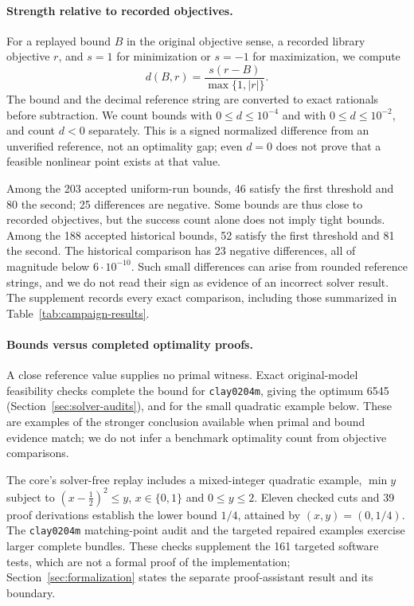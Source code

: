 

\paragraph{Strength relative to recorded objectives.}
\label{sec:reference-comparison}
For a replayed bound $B$ in the original objective sense, a recorded library
objective $r$, and $s=1$ for minimization or $s=-1$ for maximization, we compute
\[
        d(B,r)=\frac{s(r-B)}{\max\{1,|r|\}}.
\]
The bound and the decimal reference string are converted to exact rationals
before subtraction. We count bounds with $0\le d\le 10^{-4}$ and with
$0\le d\le 10^{-2}$, and count $d<0$ separately. This is a signed normalized
difference from an unverified reference, not an optimality gap; even $d=0$
does not prove that a feasible nonlinear point exists at that value.

Among the 203 accepted uniform-run bounds, 46 satisfy the first threshold
and 80 the second; 25 differences are negative. Some bounds are thus close to
recorded objectives, but the success count alone does not imply tight bounds.
Among the 188 accepted historical bounds, 52 satisfy the first threshold and 81
the second. The historical comparison has 23 negative differences, all of
magnitude below $6\cdot10^{-10}$. Such small differences can arise from rounded
reference strings, and we do not read their sign as evidence of an incorrect
solver result. The supplement records every exact comparison, including those
summarized in Table~\ref{tab:campaign-results}.

\paragraph{Bounds versus completed optimality proofs.}
A close reference value supplies no primal witness. Exact original-model
feasibility checks complete the bound for \texttt{clay0204m}, giving the optimum
6545 (Section~\ref{sec:solver-audits}), and for the small quadratic example
below. These are examples of the stronger conclusion available when primal
and bound evidence match; we do not infer a benchmark optimality count from
objective comparisons.

The core's solver-free replay includes a mixed-integer quadratic example,
$\min y$ subject to $(x-\tfrac12)^2\le y$, $x\in\{0,1\}$ and $0\le y\le2$.
Eleven checked cuts and 39 proof derivations establish the lower bound
$1/4$, attained by $(x,y)=(0,1/4)$. The \texttt{clay0204m} matching-point audit
and the targeted repaired examples exercise larger complete bundles. These
checks supplement the 161 targeted software tests, which are not a formal
proof of the implementation; Section~\ref{sec:formalization} states the
separate proof-assistant result and its boundary.


